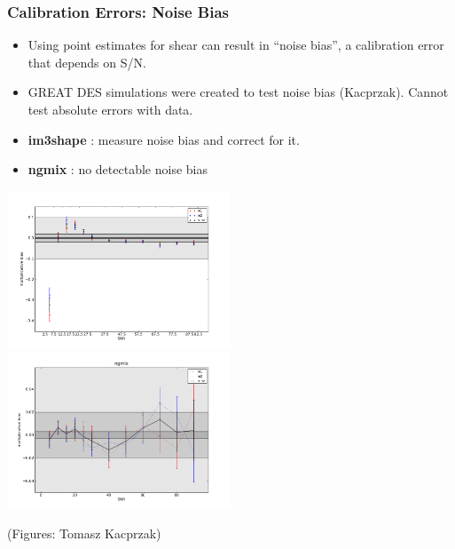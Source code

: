 \documentclass{beamer}
\newcommand{\ngmix}{ {\bf ngmix} }
\newcommand{\imshape}{ {\bf im3shape} }
\begin{document}
\frame
{
    \frametitle{Calibration Errors: Noise Bias}

    \begin{itemize}

        \item Using point estimates for shear can result in ``noise bias'', a
            calibration error that depends on S/N.

        \item GREAT DES simulations were created to test noise bias (Kacprzak).
            Cannot test absolute errors with data.

        \item \imshape:  measure noise bias and correct for it.

        \item \ngmix: no detectable noise bias

    \end{itemize}

    \begin{center}
        \includegraphics[width=0.5\textwidth]{noise-bias-im3shape.png}
        \includegraphics[width=0.5\textwidth]{noise-bias-ngmix.png}
    \end{center}
    {\tiny (Figures: Tomasz Kacprzak)}
}
\end{document}
